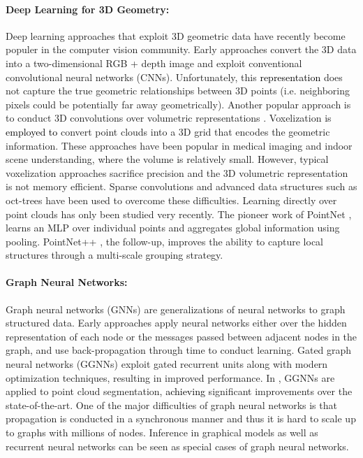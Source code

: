 \documentclass[10pt,twocolumn,letterpaper]{article}
\newcommand\simon[1]{\textcolor{black}{#1}}
\begin{document}
\paragraph{Deep Learning for 3D Geometry:} Deep learning approaches that exploit 3D geometric data have recently become populer in the computer vision  community.  
Early approaches convert the 3D data into a  two-dimensional  RGB + depth image \cite{fcn, rgbd-detection-seg} and exploit  conventional convolutional neural networks (CNNs). Unfortunately, this \simon{representation} does not capture the true  geometric relationships between  3D points (i.e. neighboring pixels could be potentially far away geometrically). Another popular approach is to  conduct 3D convolutions over volumetric representations \cite{modelnet40, subvolume, octnet, sparseconvnet, voxnet}.  Voxelization is \simon{employed to}
convert point clouds 
into a 3D grid that encodes the geometric information. 
These approaches have been popular in medical imaging and indoor scene understanding, where the volume is relatively small. However, typical voxelization approaches sacrifice  precision and the 3D volumetric representation is not memory efficient. Sparse convolutions \cite{sparseconvnet} and advanced data structures such as oct-trees \cite{octnet} have been used to overcome these difficulties.  Learning directly over point clouds has only been studied very recently. The pioneer work of PointNet \cite{pointnet}, learns an MLP over individual points and aggregates global information using pooling. PointNet++ \cite{pointnet2}, the follow-up, improves the ability to capture local structures through a multi-scale grouping strategy. 

\paragraph{Graph Neural Networks:}  Graph neural networks (GNNs) \cite{gnn} are generalizations of neural networks to graph structured data. Early approaches apply neural networks either over the hidden representation of each node or the messages passed between adjacent nodes in the graph, and use back-propagation through time to conduct learning. Gated graph neural networks (GGNNs) \cite{ggnn} exploit  gated recurrent units along with modern optimization techniques, resulting in improved performance.
In \cite{3dgnn}, GGNNs are applied to point cloud segmentation, \simon{achieving} significant improvements over the state-of-the-art.  One of the major difficulties of graph neural networks is that  propagation is conducted in a synchronous manner and thus it is hard to scale up to graphs with millions of nodes.   
Inference in graphical models as well as recurrent neural networks can be seen as special cases of graph neural networks. 
\end{document}
